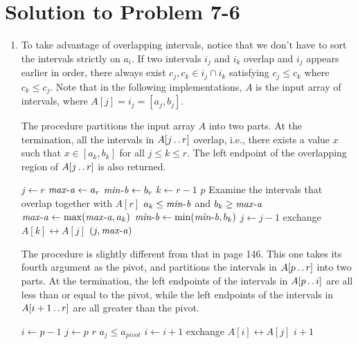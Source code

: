 \documentclass[a4paper, fleqn]{article}
\begin{document}
\section*{Solution to Problem 7-6}
\begin{enumerate}
\renewcommand{\labelenumi}{\itshape \bfseries \alph{enumi}.}

\item  %
To take advantage of overlapping intervals, notice that we don't have to sort
the intervals strictly on $a_i$. If two intervals $i_j$ and $i_k$ overlap and 
$i_j$ appears earlier in order, there always exist $c_j, c_k \in i_j \cap i_k$ 
satisfying $c_j \leq c_k$ where $c_k \leq c_j$. Note that in the following 
implementations, $A$ is the input array of intervals, where $A[j] = i_j = 
[a_j, b_j]$.

The  procedure partitions the input array $A$ into two 
parts. At the termination, all the intervals in $A[j \mathinner{\ldotp\ldotp} r]$ overlap, i.e., 
there exists a value $x$ such that $x \in [a_k,b_k]$ for all $j \leq k \leq r$. 
The left endpoint of the overlapping region of $A[j \mathinner{\ldotp\ldotp} r]$ is also 
returned.
\begin{codebox}
\li $j \gets r$
\li $\id{max-a} \gets a_r$
\li $\id{min-b} \gets b_r$
\li \For $k \gets r - 1$ \Downto $p$
\li     \Do \Comment Examine the intervals that overlap together with $A[r]$
\li         \If $a_k \leq \id{min-b}$ and $b_k \geq \id{max-a}$
\li             \Then
                    $\id{max-a} \gets \max(\id{max-a}, a_k)$
\li                 $\id{min-b} \gets \min(\id{min-b}, b_k)$
\li                 $j \gets j - 1$
\li                 exchange $A[k] \leftrightarrow A[j]$
                \End
        \End
\li \Return $(j,\id{max-a})$            
\end{codebox}

The  procedure is slightly different from that in page 146. This 
one takes its fourth argument as the pivot, and partitions the intervals in 
$A[p \mathinner{\ldotp\ldotp} r]$ into two parts. At the termination, the left endpoints of the 
intervals in $A[p \mathinner{\ldotp\ldotp} i]$ are all less than or equal to the pivot, while 
the left endpoints of the intervals in $A[i+1 \mathinner{\ldotp\ldotp} r]$ are all greater than 
the pivot.
\begin{codebox}
\li $i \gets p - 1$
\li \For $j \gets p$ \To $r$
\li     \Do
            \If $a_j \leq a_{pivot}$
\li             \Then
                    $i \gets i + 1$
\li                 exchange $A[i] \leftrightarrow A[j]$
                \End
        \End
\li \Return $i + 1$
\end{codebox}


\end{enumerate}
\end{document}
